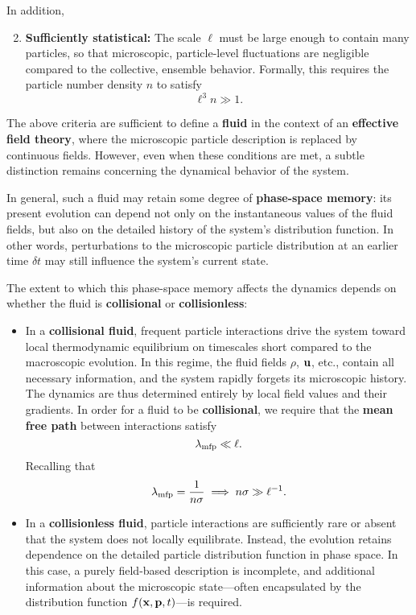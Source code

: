 In addition,

\begin{enumerate}
    \setcounter{enumi}{1}
    \item \textbf{Sufficiently statistical:} The scale $\ell$ must be large enough to contain many particles, so that microscopic, particle-level fluctuations are negligible compared to the collective, ensemble behavior. Formally, this requires the particle number density $n$ to satisfy
\begin{equation}
    \label{eq:fluid_conditions_2}
    \ell^3 n \gg 1.
\end{equation}
\end{enumerate}

\vspace{0.25cm}
The above criteria are sufficient to define a \textbf{fluid} in the context of an \textbf{effective field theory}, where the microscopic particle description is replaced by continuous fields. However, even when these conditions are met, a subtle distinction remains concerning the dynamical behavior of the system.

In general, such a fluid may retain some degree of \textbf{phase-space memory}: its present evolution can depend not only on the instantaneous values of the fluid fields, but also on the detailed history of the system's distribution function. In other words, perturbations to the microscopic particle distribution at an earlier time $\delta t$ may still influence the system's current state.

The extent to which this phase-space memory affects the dynamics depends on whether the fluid is \textbf{collisional} or \textbf{collisionless}:
\begin{itemize}
    \item In a \textbf{collisional fluid}, frequent particle interactions drive the system toward local thermodynamic equilibrium on timescales short compared to the macroscopic evolution. In this regime, the fluid fields $\rho$, ${\bf u}$, etc., contain all necessary information, and the system rapidly forgets its microscopic history. The dynamics are thus determined entirely by local field values and their gradients. In order for a fluid to be \textbf{collisional}, we require that the \textbf{mean free path} between interactions satisfy
\begin{equation}
    \label{eq:fluid_condition_collisional}
    \lambda_{\rm mfp} \ll \ell.
\end{equation}
Recalling that
\begin{equation}
    \lambda_{\rm mfp} = \frac{1}{n\sigma} \implies n\sigma \gg \ell^{-1}.
\end{equation}
    
    \item In a \textbf{collisionless fluid}, particle interactions are sufficiently rare or absent that the system does not locally equilibrate. Instead, the evolution retains dependence on the detailed particle distribution function in phase space. In this case, a purely field-based description is incomplete, and additional information about the microscopic state—often encapsulated by the distribution function $f({\bf x}, {\bf p}, t)$—is required.
\end{itemize}

